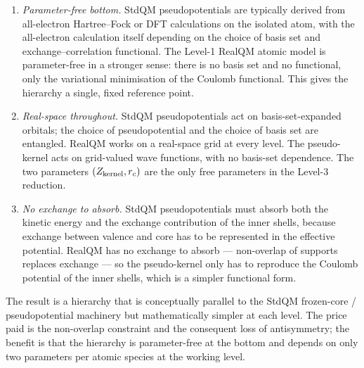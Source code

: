 \begin{enumerate}
\item \emph{Parameter-free bottom.} StdQM pseudopotentials are typically derived from all-electron Hartree--Fock or DFT calculations on the isolated atom, with the all-electron calculation itself depending on the choice of basis set and exchange--correlation functional. The Level-1 RealQM atomic model is parameter-free in a stronger sense: there is no basis set and no functional, only the variational minimisation of the Coulomb functional. This gives the hierarchy a single, fixed reference point.
\item \emph{Real-space throughout.} StdQM pseudopotentials act on basis-set-expanded orbitals; the choice of pseudopotential and the choice of basis set are entangled. RealQM works on a real-space grid at every level. The pseudo-kernel acts on grid-valued wave functions, with no basis-set dependence. The two parameters $(Z_{\rm kernel}, r_c)$ are the only free parameters in the Level-3 reduction.
\item \emph{No exchange to absorb.} StdQM pseudopotentials must absorb both the kinetic energy and the exchange contribution of the inner shells, because exchange between valence and core has to be represented in the effective potential. RealQM has no exchange to absorb --- non-overlap of supports replaces exchange --- so the pseudo-kernel only has to reproduce the Coulomb potential of the inner shells, which is a simpler functional form.
\end{enumerate}

The result is a hierarchy that is conceptually parallel to the StdQM frozen-core / pseudopotential machinery but mathematically simpler at each level. The price paid is the non-overlap constraint and the consequent loss of antisymmetry; the benefit is that the hierarchy is parameter-free at the bottom and depends on only two parameters per atomic species at the working level.

